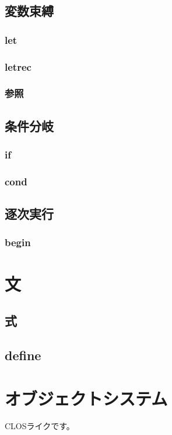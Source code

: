 \documentclass{article}
\begin{document}
\subsection{変数束縛}
\subsubsection{let}
\subsubsection{letrec}
\subsubsection{参照}

\subsection{条件分岐}
\subsubsection{if}
\subsubsection{cond}

\subsection{逐次実行}
\subsubsection{begin}

\section{文}
\subsection{式}

\subsection{define}

\section{オブジェクトシステム}
CLOSライクです。
\end{document}
